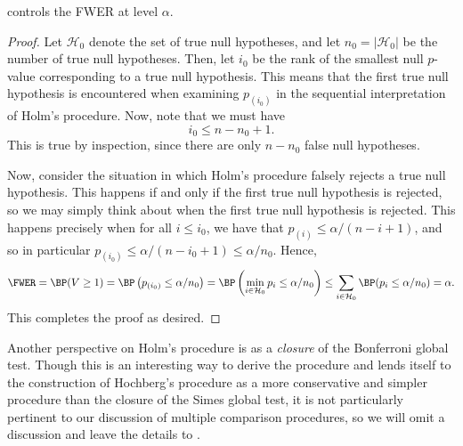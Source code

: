 \begin{prop}
 controls the FWER at level $\alpha$.
\end{prop}
\begin{proof}
Let $\mathcal{H}_0$ denote the set of true null hypotheses, and let $n_0 = |\mathcal{H}_0|$ be the number of true null hypotheses. Then, let $i_0$ be the rank of the smallest null $p$-value corresponding to a true null hypothesis. This means that the first true null hypothesis is encountered when examining $p_{(i_0)}$ in the sequential interpretation of Holm's procedure. Now, note that we must have
\[ i_0 \leq n - n_0 + 1. \] This is true by inspection, since there are only $n - n_0$ false null hypotheses.

Now, consider the situation in which Holm's procedure falsely rejects a true null hypothesis. This happens if and only if the first true null hypothesis is rejected, so we may simply think about when the first true null hypothesis is rejected. This happens precisely when for all $i \leq i_0$, we have that $p_{(i)} \leq \alpha / (n - i + 1)$, and so in particular $p_{(i_0)} \leq \alpha / (n - i_0 + 1) \leq \alpha / n_0$. Hence,
\[ \FWER = \BP(V \geq 1) = \BP\left( p_{(i_0)} \leq \alpha / n_0 \right) = \BP\left( \min_{i \in \mathcal{H}_0} p_{i} \leq \alpha / n_0 \right) \leq \sum_{i \in \mathcal{H}_0} \BP(p_{i} \leq \alpha / n_0)  = \alpha. \]
This completes the proof as desired.
\end{proof}

\begin{note*}
Another perspective on Holm's procedure is as a \emph{closure} of the Bonferroni global test. Though this is an interesting way to derive the procedure and lends itself to the construction of Hochberg's procedure as a more conservative and simpler procedure than the closure of the Simes global test, it is not particularly pertinent to our discussion of multiple comparison procedures, so we will omit a discussion and leave the details to \cite{stat300}.
\end{note*}


